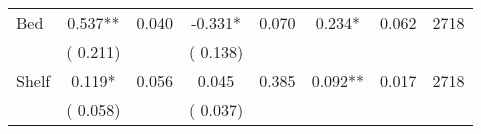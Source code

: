 \begin{tabular}{l*{7}{c}}
 Bed       &              0.537**       &        0.040  &             -0.331*       &        0.070  &              0.234*       &              0.062 &  2718 \\ 
                       &       (       0.211)             &                               &       (       0.138)                     &                               &                                               &                                &                      \\ 

 Shelf       &              0.119*       &        0.056  &              0.045       &        0.385  &              0.092**       &              0.017 &  2718 \\ 
                       &       (       0.058)             &                               &       (       0.037)                     &                               &                                               &                                &                      \\ 

\hline \end{tabular}